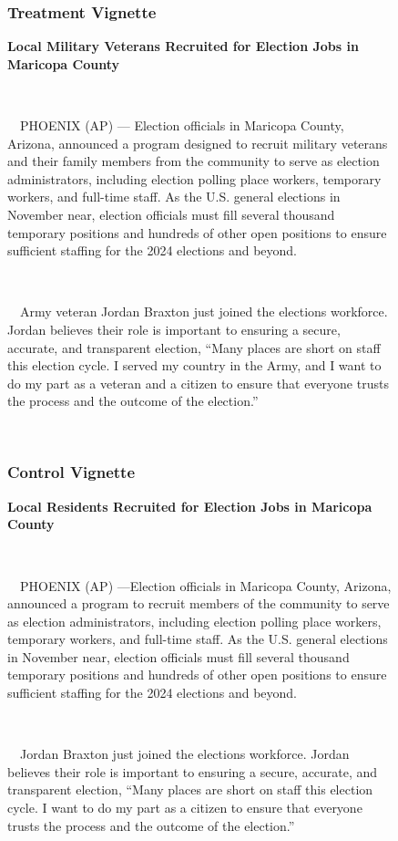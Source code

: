 \documentclass[
  12pt,
  letterpaper,
]{article}
\begin{document}
\begin{figure}

\begin{minipage}{0.45\linewidth}

\subsubsection{Treatment Vignette}\label{treatment-vignette-1}

\textbf{Local Military Veterans Recruited for Election Jobs in Maricopa
County}\\
\strut \\
\strut ~~PHOENIX (AP) --- Election officials in Maricopa County,
Arizona, announced a program designed to recruit military veterans and
their family members from the community to serve as election
administrators, including election polling place workers, temporary
workers, and full-time staff. As the U.S. general elections in November
near, election officials must fill several thousand temporary positions
and hundreds of other open positions to ensure sufficient staffing for
the 2024 elections and beyond.\\
\strut \\
\strut ~~Army veteran Jordan Braxton just joined the elections
workforce. Jordan believes their role is important to ensuring a secure,
accurate, and transparent election, ``Many places are short on staff
this election cycle. I served my country in the Army, and I want to do
my part as a veteran and a citizen to ensure that everyone trusts the
process and the outcome of the election.''

\end{minipage}%
%
\begin{minipage}{0.10\linewidth}
~\end{minipage}%
%
\begin{minipage}{0.45\linewidth}

\subsubsection{Control Vignette}\label{control-vignette-1}

\textbf{Local Residents Recruited for Election Jobs in Maricopa
County}\\
\strut \\
\strut ~~PHOENIX (AP) ---Election officials in Maricopa County, Arizona,
announced a program to recruit members of the community to serve as
election administrators, including election polling place workers,
temporary workers, and full-time staff. As the U.S. general elections in
November near, election officials must fill several thousand temporary
positions and hundreds of other open positions to ensure sufficient
staffing for the 2024 elections and beyond.\\
\strut \\
\strut ~~Jordan Braxton just joined the elections workforce. Jordan
believes their role is important to ensuring a secure, accurate, and
transparent election, ``Many places are short on staff this election
cycle. I want to do my part as a citizen to ensure that everyone trusts
the process and the outcome of the election.''


\end{minipage}
\end{figure}
\end{document}
